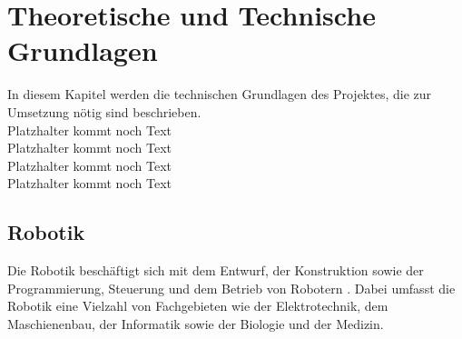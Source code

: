 \section{Theoretische und Technische Grundlagen}
\color{finishing}
In diesem Kapitel werden die technischen Grundlagen des Projektes, die zur Umsetzung nötig sind beschrieben.
\\Platzhalter kommt noch Text
\\Platzhalter kommt noch Text
\\Platzhalter kommt noch Text
\\Platzhalter kommt noch Text
\subsection{Robotik} %
\color{finishing}
Die Robotik beschäftigt sich mit dem Entwurf, der Konstruktion sowie der Programmierung, Steuerung und dem Betrieb 
von Robotern . Dabei umfasst die Robotik eine Vielzahl 
von Fachgebieten wie der Elektrotechnik, dem Maschienenbau, der Informatik sowie der Biologie und der Medizin.
